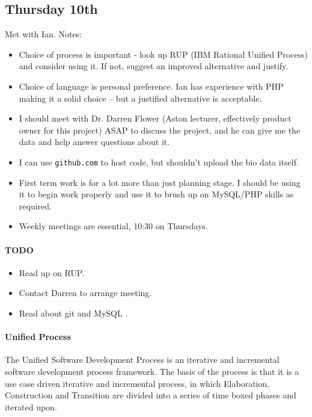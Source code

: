 \subsection{Thursday 10th}
Met with Ian. Notes:

\begin{itemize}
\item Choice of process is important - look up RUP (IBM Rational Unified
  Process) \cite{IBMRUP} and consider using it. If not, suggest an improved
  alternative and justify.
\item Choice of language is personal preference. Ian has experience with PHP
  making it a solid choice – but a justified alternative is acceptable.
\item I should meet with Dr. Darren Flower (Aston lecturer, effectively product
  owner for this project) ASAP to discuss the project, and he can give me the
  data and help answer questions about it.
\item I can use \texttt{github.com} to host code, but shouldn’t upload the bio
  data itself.
\item First term work is for a lot more than just planning stage. I should be
  using it to begin work properly and use it to brush up on MySQL/PHP skills as
  required.
\item Weekly meetings are essential, 10:30 on Thursdays.
\end{itemize}

\paragraph{TODO}
\begin{itemize}
\item Read up on RUP.
\item Contact Darren to arrange meeting.
\item Read about git and MySQL \cite{Kulbertis2011}.
\end{itemize}

\paragraph{Unified Process} The Unified Software Development Process is an
iterative and incremental software development process framework. The basis of
the process is that it is a use case driven iterative and incremental process,
in which Elaboration, Construction and Transition are divided into a series of
time boxed phases and iterated upon.

